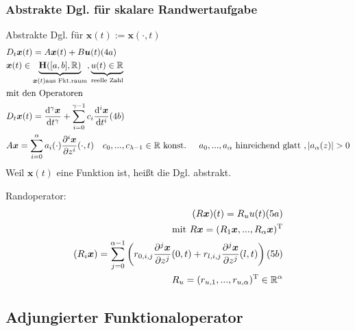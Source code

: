 \newpage
\subsubsection{Abstrakte Dgl. für skalare Randwertaufgabe}
Abstrakte Dgl. für $\bm{x}(t):= \bm{x}(\cdot,t)$
\begin{align*}
& D_t \bm{x}(t) = A \bm{x}(t) + B \bm{u}(t) (4a)\\
& \bm{x}(t) \in \underbrace{\mathbf{H}([a,b],\R)}_{\bm{x}(t) \textrm{aus Fkt.raum}}, 
\underbrace{u(t) \in \R}_{\textrm{reelle Zahl}} \\
& \textrm{mit den Operatoren} \\
& D_t \bm{x}(t) = \frac{\d^\gamma \bm{x}}{\d t^\gamma}+ \sum_{i=0}^{\gamma-1}c_i\frac{\d^i \bm{x}}{\d t^i} (4b)\\
& A \bm{x} = \sum_{i=0}^\alpha a_i(\cdot)\pd[i]{\bm{x}}{z^i}(\cdot,t) \quad c_0,...,c_{\lambda-1} \in \R \textrm{ konst. }
\quad a_0,...,a_\alpha \textrm{ hinreichend glatt }, |a_\alpha(z)|>0
\end{align*}
Weil $\bm{x}(t)$ eine Funktion ist, heißt die Dgl. abstrakt.

Randoperator:
\begin{align*}
(R\bm{x})(t) = R_u u(t) (5a) \\
\textrm{mit } R \bm{x} = (R_1\bm{x},...,R_\alpha \bm{x})^\textrm{T} \\
(R_i\bm{x}) = \sum_{j=0}^{\alpha-1}\left(r_{0,i,j}\pd[j]{\bm{x}}{z^j}(0,t)+r_{l,i,j}\pd[j]{\bm{x}}{z^j}(l,t) \right) (5b) \\
R_u =(r_{u,1},...,r_{u,\alpha})^\textrm{T} \in \R^\alpha
\end{align*}
\subsection{Adjungierter Funktionaloperator}
